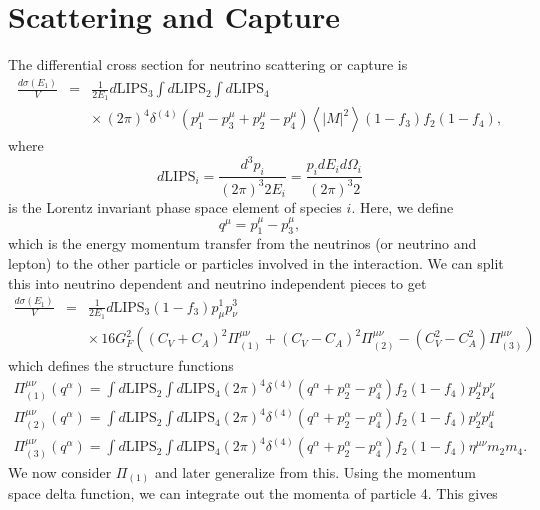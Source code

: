 \documentclass[12pt,letter]{article}
\begin{document}
\section{Scattering and Capture} 
The differential cross section for neutrino scattering or capture is 
\begin{eqnarray*}
\frac{d \sigma(E_1)}{V} &=& \frac{1}{2 E_1} d\textrm{LIPS}_3 \int d\textrm{LIPS}_2 
\int d\textrm{LIPS}_4 \\
&& \times \, (2 \pi)^4 \delta^{(4)}\left(p^\mu_1 - p^\mu_3 + p^\mu_2 - p^\mu_4 \right)
\left\langle \left| M \right|^2 \right \rangle (1-f_3) f_2 (1-f_4),
\end{eqnarray*}
where 
\begin{equation*}
d\textrm{LIPS}_i = \frac{d^3p_i}{(2\pi)^3 2 E_i} 
= \frac{p_i dE_i d \Omega_i}{(2\pi)^3 2} 
\end{equation*}
is the Lorentz invariant phase space element of species $i$.  Here, we define 
\begin{equation}
q^\mu = p_1^\mu - p_3^\mu,
\end{equation}
which is the energy momentum transfer from the neutrinos (or neutrino and lepton) to the other particle or particles involved in the interaction.  We can split this into neutrino dependent and neutrino independent pieces to get 
\begin{eqnarray*}
\frac{d \sigma(E_1)}{V} &=& \frac{1}{2 E_1}  d\textrm{LIPS}_3 (1-f_3) 
p^1_\mu p^3_\nu \\
&&\times \, 16 G_F^2\left( 
 (C_V+C_A)^2 \Pi_{(1)}^{\mu \nu}
+(C_V-C_A)^2 \Pi_{(2)}^{\mu \nu}
-(C_V^2-C_A^2) \Pi_{(3)}^{\mu \nu} \right)
\end{eqnarray*}
which defines the structure functions 
\begin{eqnarray*}
\Pi_{(1)}^{\mu \nu}(q^\alpha) = \int d\textrm{LIPS}_2 \int d\textrm{LIPS}_4
(2 \pi)^4 \delta^{(4)}\left(q^\alpha + p^\alpha_2 - p^\alpha_4 \right) 
f_2(1-f_4)p^\mu_2 p^\nu_4 \nonumber\\
\Pi_{(2)}^{\mu \nu}(q^\alpha) = \int d\textrm{LIPS}_2 \int d\textrm{LIPS}_4
(2 \pi)^4 \delta^{(4)}\left(q^\alpha + p^\alpha_2 - p^\alpha_4 \right) 
f_2(1-f_4) p^\nu_2 p^\mu_4 \nonumber\\
\Pi_{(3)}^{\mu \nu}(q^\alpha) = \int d\textrm{LIPS}_2 \int d\textrm{LIPS}_4
(2 \pi)^4 \delta^{(4)}\left(q^\alpha + p^\alpha_2 - p^\alpha_4 \right) 
f_2(1-f_4) \eta^{\mu \nu} m_2 m_4.
\end{eqnarray*} 
We now consider $\Pi_{(1)}$ and later generalize from this.  Using the momentum space delta function, we can integrate out the momenta of particle 4.  This gives
\end{document}
